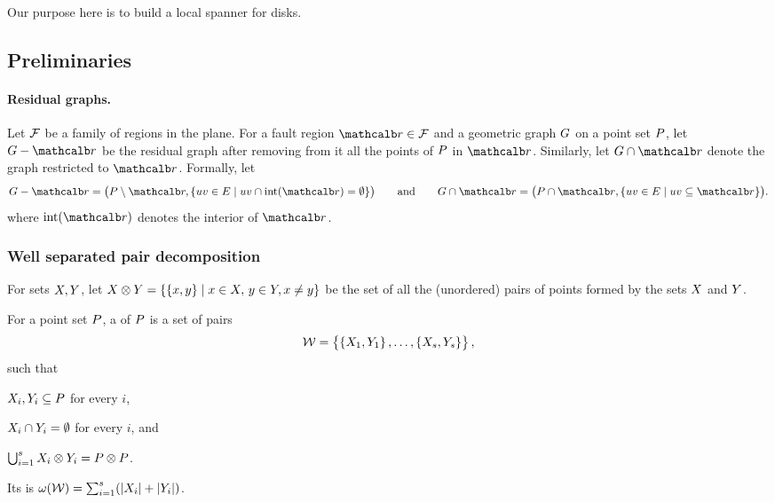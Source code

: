\documentclass[12pt]{article}%
\begin{document}
Our purpose here is to build a local spanner for disks.

\subsection{Preliminaries}


\paragraph{Residual graphs.}

Let $\mathcal{F}$ be a family of regions in the plane. For a fault region
$\region \in \FF$ and a geometric graph $G$ on a point set $P$, let
$\G \gminus \region$ be the residual graph after removing from it all
the points of $P$ in $\region$. Similarly, let
$\restrictY{\G}{\region}$ denote the graph restricted to $\region$.
Formally, let
\begin{equation*}
    \G \gminus \region%
    =%
    \bigl( \PS \setminus \region, \Set{ uv \in \EG }{ uv \cap
       \interiorX{\region} = \emptyset} \bigr)
    \qquad\text{and}\qquad%
    \restrictY{\G}{\region}%
    =%
    \bigl( \PS \cap {\region},
    \Set{uv \in \EG}{ uv \subseteq {\region} } \bigr).
\end{equation*}
where $\interiorX{\region}$ denotes the interior of $\region$.


\subsubsection{Well separated pair decomposition}

For sets $X, Y$, let
\begin{math}
    \PSX \otimes \PSY%
    =%
    \Set{\brc{\px,\py}}{ \px\in \PSX,\, \py\in \PSY, \px \ne \py }
\end{math}
be the set of all the (unordered) pairs of points formed by the sets
$X$ and $Y$.

\begin{defn}
    For a point set $P$, a  of $P$ is a set of pairs
    \begin{equation*}
        \mathcal{W} = \left\{ {\bigl. \left\{ {X_1,Y_1} \right\},\ldots,\left\{ {X_s,Y_s} \right\}} \right\},
    \end{equation*}
    such that
    \begin{enumerate*}[label=(\Roman*)]
        \item $X_i,Y_i\subseteq P$ for every $i$,
        \item $X_i \cap Y_i = \emptyset$ for every $i$, and
        \item
        $\bigcup_{i=1}^s X_i \otimes Y_i = P \otimes P$.
    \end{enumerate*}
    Its  is
    $\WeightX{\WS} = \sum_{i=1}^s \pth{ \cardin{\PSX_i } +
       \cardin{\PSY_i}}$.
\end{defn}
\end{document}
